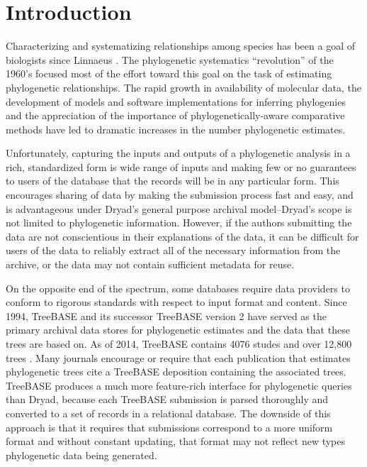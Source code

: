 \documentclass{bioinfo}
\begin{document}
\section{Introduction}

Characterizing and systematizing relationships among species has been a goal of biologists since Linnaeus \cite{Linne1758}.
The phylogenetic systematics ``revolution'' of the 1960's focused most of the effort toward this goal on the 
    task of estimating phylogenetic relationships.
The rapid growth in availability of molecular data, the development of models and software implementations for
    inferring phylogenies and the appreciation of the importance of phylogenetically-aware comparative methods
    \citep[e.g.][]{Felsenstein1985Comp} have led to dramatic increases in the number phylogenetic estimates.


Unfortunately, capturing the inputs and outputs of a phylogenetic analysis in a rich, standardized form is
    wide range of inputs and making few or no
    guarantees to users of the database that the records will be in any particular form.
This encourages sharing of data by making the submission process fast and easy, and is advantageous under Dryad's
    general purpose archival model--Dryad's scope is not limited to phylogenetic information.
However, if the authors submitting the data are not conscientious in their explanations of the data, it can be difficult
    for users of the data to reliably extract all of the necessary information from the archive, or the data may not contain sufficient metadata for reuse.

On the opposite end of the spectrum, some databases require data providers to conform to rigorous
    standards with respect to input format and content.
Since 1994, TreeBASE \citep{SandersonDPE1994} and its successor TreeBASE version 2 \citep{TreeBase2} have served
    as the primary archival data stores for phylogenetic estimates and the data that these trees are based on.
As of 2014, TreeBASE contains 4076 studes and over 12,800 trees \citep{TreeBaseWebCite}.
Many journals encourage or require that each publication that estimates phylogenetic trees cite a TreeBASE
    deposition containing the associated trees.
TreeBASE produces a much more feature-rich interface for phylogenetic queries than Dryad, because each 
    TreeBASE submission is parsed thoroughly and converted to a set of records in a relational database.
The downside of this approach is that it requires that submissions correspond to a more uniform format and without constant updating,
    that format may not reflect new types phylogenetic data being generated.
\end{document}
